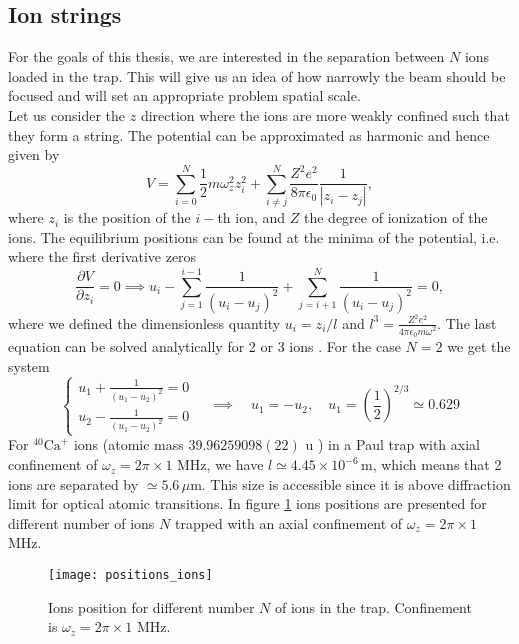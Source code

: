 \subsection{Ion strings}
\label{ionstrings}
For the goals of this thesis, we are interested in the separation between $N$ ions loaded in the trap. This will give us an idea of how narrowly the beam should be focused and will set an appropriate problem spatial scale.\\
Let us consider the $z$ direction where the ions are more weakly confined such that they form a string. The potential can be approximated as harmonic and hence given by
\begin{equation}
V = \sum_{i=0}^N \frac{1}{2}m\omega_z^2z_i^2 + \sum_{i\neq j}^N\frac{Z^2e^2}{8\pi \epsilon_0}\frac{1}{|z_i-z_j|},
\end{equation}
where $z_i$ is the position of the $i-$th ion, and $Z$ the degree of ionization of the ions. The equilibrium positions can be found at the minima of the potential, i.e. where the first derivative zeros
\begin{equation}
\frac{\partial V}{\partial z_i} = 0 \implies u_i - \sum_{j=1}^{i-1} \frac{1}{(u_i-u_j)^2} + \sum_{j= i+1}^{N} \frac{1}{(u_i-u_j)^2}= 0,
\end{equation}
where we defined the dimensionless quantity $u_i = z_i/l$ and $l^3 = \displaystyle\frac{Z^2 e^2 }{4\pi \epsilon_0 m\omega^2}$.
The last equation can be solved analytically for 2 or 3 ions \cite{ion_spacing}. For the case $N=2$ we get the system
\begin{equation}
\begin{cases}
  u_1 + \frac{1}{(u_1-u_2)^2} = 0\\
  u_2 - \frac{1}{(u_1-u_2)^2} = 0
  \end{cases} \quad \implies \quad u_1 = -u_2,\quad  u_1 = \left(\frac{1}{2}\right)^{2/3} \simeq 0.629
\end{equation}
For $^{40}\text{Ca}^+$ ions (atomic mass $39.96259098(22)$ u \cite{AUDI2003337}) in a Paul trap with axial confinement of $\omega_z = 2\pi \times 1$ MHz, we have $l \simeq 4.45\times 10^{-6}\,$m, which means that 2 ions are separated by $\simeq 5.6\, \mu$m. This size is accessible since it is above diffraction limit for optical atomic transitions.
In figure \ref{positions_ions} ions positions are presented for different number of ions $N$ trapped with an axial confinement of $\omega_z = 2\pi \times 1$ MHz.

\begin{figure}[H]
\hspace{-5em}\texttt{[image: positions\_ions]}
\caption{Ions position for different number $N$ of ions in the trap. Confinement is $\omega_z = 2\pi\times 1$ MHz.}
\label{positions_ions}
\end{figure}


